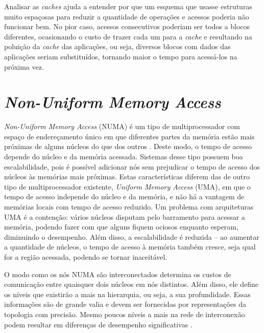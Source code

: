 Analisar as \textit{caches} ajuda a entender por que um esquema que usasse estruturas muito espaçosas para reduzir a quantidade de operações e acessos poderia não funcionar bem.
No pior caso, acessos consecutivos poderiam ser todos a blocos diferentes, ocasionando o custo de trazer cada um para a \textit{cache} e resultando na poluição da \textit{cache} das aplicações, ou seja, diversos blocos com dados das aplicações seriam substituídos, tornando maior o tempo para acessá-los na próxima vez.


\section{\textit{Non-Uniform Memory Access}}
\label{sec:numa}

\textit{Non-Uniform Memory Access} (NUMA) é um tipo de multiprocessador com espaço de endereçamento único em que diferentes partes da memória estão mais próximas de alguns núcleos do que dos outros \cite{Patterson}.
Deste modo, o tempo de acesso depende do núcleo e da memória acessada.
Sistemas desse tipo possuem boa escalabilidade, pois é possível adicionar nós sem prejudicar o tempo de acesso dos núcleos às memórias mais próximas.
Estas características diferem das de outro tipo de multiprocessador existente, \textit{Uniform Memory Access} (UMA), em que o tempo de acesso independe do núcleo e da memória, e não há a vantagem de memórias locais com tempo de acesso reduzido.
Um problema com arquiteturas UMA é a contenção: vários núcleos disputam pelo barramento para acessar a memória, podendo fazer com que alguns fiquem ociosos enquanto esperam, diminuindo o desempenho.
Além disso, a escalabilidade é reduzida -- ao aumentar a quantidade de núcleos, o tempo de acesso à memória também cresce, seja qual for a região acessada, podendo se tornar inaceitável.

O modo como os nós NUMA são interconectados determina os custos de comunicação entre quaisquer dois núcleos em nós distintos.
Além disso, ele define os níveis que existirão a mais na hierarquia, ou seja, a sua profundidade.
Essas informações são de grande valia e devem ser fornecidas por representações da topologia com precisão.
Mesmo poucos níveis a mais na rede de interconexão podem resultar em diferenças de desempenho significativas \cite{MPITopFunc}.



